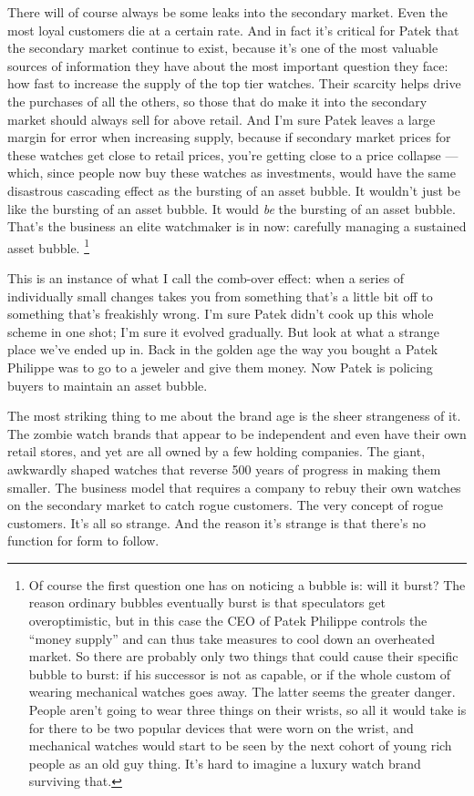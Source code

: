 \documentclass[12pt]{book}
\begin{document}
There will of course always be some leaks into the secondary market.
Even the most loyal customers die at a certain rate. And in fact it's
critical for Patek that the secondary market continue to exist, because
it's one of the most valuable sources of information they have about the
most important question they face: how fast to increase the supply of
the top tier watches. Their scarcity helps drive the purchases of all
the others, so those that do make it into the secondary market should
always sell for above retail. And I'm sure Patek leaves a large margin
for error when increasing supply, because if secondary market prices for
these watches get close to retail prices, you're getting close to a
price collapse --- which, since people now buy these watches as
investments, would have the same disastrous cascading effect as the
bursting of an asset bubble. It wouldn't just be like the bursting of an
asset bubble. It would \emph{be} the bursting of an asset bubble. That's
the business an elite watchmaker is in now: carefully managing a
sustained asset bubble. \footnote{Of course the first question one has on noticing a bubble is:
will it burst? The reason ordinary bubbles eventually burst is that
speculators get overoptimistic, but in this case the CEO of Patek
Philippe controls the ``money supply'' and can thus take measures to
cool down an overheated market. So there are probably only two things
that could cause their specific bubble to burst: if his successor is not
as capable, or if the whole custom of wearing mechanical watches goes
away. The latter seems the greater danger. People aren't going to wear
three things on their wrists, so all it would take is for there to be
two popular devices that were worn on the wrist, and mechanical watches
would start to be seen by the next cohort of young rich people as an old
guy thing. It's hard to imagine a luxury watch brand surviving that.}

This is an instance of what I call the comb-over effect: when a series
of individually small changes takes you from something that's a little
bit off to something that's freakishly wrong. I'm sure Patek didn't cook
up this whole scheme in one shot; I'm sure it evolved gradually. But
look at what a strange place we've ended up in. Back in the golden age
the way you bought a Patek Philippe was to go to a jeweler and give them
money. Now Patek is policing buyers to maintain an asset bubble.

The most striking thing to me about the brand age is the sheer
strangeness of it. The zombie watch brands that appear to be independent
and even have their own retail stores, and yet are all owned by a few
holding companies. The giant, awkwardly shaped watches that reverse 500
years of progress in making them smaller. The business model that
requires a company to rebuy their own watches on the secondary market to
catch rogue customers. The very concept of rogue customers. It's all so
strange. And the reason it's strange is that there's no function for
form to follow.
\end{document}
